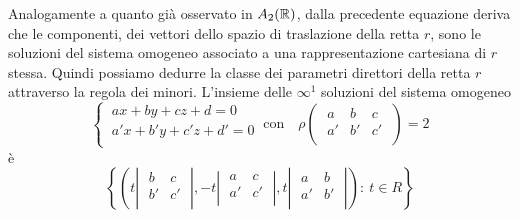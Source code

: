 Analogamente a quanto già osservato in \(A_2(\RR )\), dalla precedente equazione deriva che le componenti, dei vettori dello spazio di traslazione della retta \(r\), sono le soluzioni del sistema omogeneo associato a una rappresentazione cartesiana di \(r\) stessa. Quindi possiamo dedurre la classe dei parametri direttori della retta \(r\) attraverso la regola dei minori. L'insieme delle \(\infty^{1}\) soluzioni del sistema omogeneo \[
\begin{cases}
    \ ax + by + cz + d = 0 \\
    \ a'x + b'y + c'z + d' = 0 \\
\end{cases} \ \text{con} \quad \rho
\left( \; \begin{matrix}
    a & b & c \\
    a' & b' & c' \\
\end{matrix} \; \right) = 2
\] è \[
\left\{ \left( t
\left| \; \begin{matrix}
    b & c \\
    b' & c' \\
\end{matrix} \; \right|,
-t
\left| \; \begin{matrix}
    a & c \\
    a' & c' \\
\end{matrix} \; \right|, t
\left| \; \begin{matrix}
    a & b \\
    a' & b' \\
\end{matrix} \; \right| \right)
: \ t \in R \right\}
\] 

